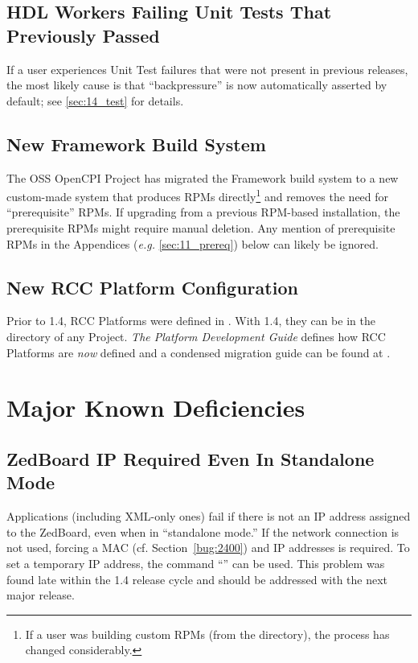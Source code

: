 \subsection{HDL Workers Failing Unit Tests That Previously Passed}
If a user experiences Unit Test failures that were not present in previous releases, the most likely cause is that ``backpressure'' is now automatically asserted by default; see \ref{sec:14_test} for details.

\subsection{New Framework Build System} %
\label{sec:14_build2}
The OSS OpenCPI Project has migrated the Framework build system to a new custom-made system that produces RPMs directly\footnote{If a user was building custom RPMs (from the  directory), the process has changed considerably.} and removes the need for ``prerequisite'' RPMs. If upgrading from a previous RPM-based installation, the prerequisite RPMs might require manual deletion. Any mention of prerequisite RPMs in the Appendices (\textit{e.g.} \ref{sec:11_prereq}) below can likely be ignored.

\subsection{New RCC Platform Configuration} %
Prior to 1.4, RCC Platforms were defined in . With 1.4, they can be in the  directory of any Project. \textit{The Platform Development Guide} defines how RCC Platforms are \textit{now} defined and a condensed migration guide can be found at  .

\section{Major Known Deficiencies}
\label{sec:14_bugs}

\subsection{ZedBoard IP Required Even In Standalone Mode} %
\label{bug:4173}
Applications (including XML-only ones) fail if there is not an IP address assigned to the ZedBoard, even when in ``standalone mode.'' If the network connection is not used, forcing a MAC (cf. Section~\ref{bug:2400}) and IP addresses is required. To set a temporary IP address, the command ``'' can be used. This problem was found late within the 1.4 release cycle and should be addressed with the next major release.

